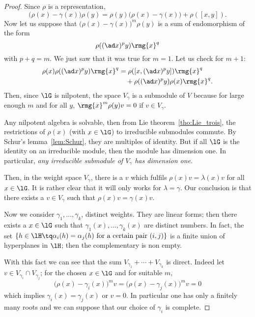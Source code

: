 \begin{proof}
	Since $\rho$ is a representation,
	\[
		\big(\rho(x)-\gamma(x)\big)\rho(y)=\rho(y)\big( \rho(x)-\gamma(x) \big)+\rho([x,y]).
	\]
	Now let us suppose that $\big(\rho(x)-\gamma(x)\big)^m\rho(y)$ is a sum of endomorphism of the form
	\[
		\rho( (\ad x)^py )\rmg{x}^q
	\]
	with $p+q=m$. We just saw that it was true for $m=1$. Let us check for $m+1$:
	\begin{equation}
		\begin{split}
			\rho(x)\rho( (\ad x)^py )\rmg{x}^q&=\rho( [x,(\ad x)^py] )\rmg{x}^q\\
			&\quad+\rho((\ad x)^py)\rho(x)\rmg{x}^q.
		\end{split}
	\end{equation}
	Then, since $\lG$ is nilpotent, the space $V_{\gamma}$ is a submodule of $V$ because for large enough $m$ and for all $y$, $\rmg{x}^m \rho(y)v=0$ if $v\in V_{\gamma}$.

	Any nilpotent algebra is solvable, then from Lie theorem~\ref{tho:Lie_trois}, the restrictions of $\rho(x)$ (with $x\in\lG$) to irreducible submodules commute. By Schur's lemma~\ref{lem:Schur}, they are multiples of identity. But if all $\lG$ is the identity on an irreducible module, then the module has dimension one. In particular, \emph{any irreducible submodule of $V_{\gamma}$ has dimension one}.

	Then, in the weight space $V_{\gamma}$, there is a $v$ which fulfils  $\rho(x)v=\lambda(x)v$ for all $x\in\lG$. It is rather clear that it will only works for $\lambda=\gamma$. Our conclusion is that there exists a $v\in V_{\gamma}$ such that $\rho(x)v=\gamma(x)v$.

	Now we consider $\gamma_1,\ldots,\gamma_k$, distinct weights. They are linear forms; then there exists a $x\in\lG$ such that $\gamma_1(x),\ldots,\gamma_k(x)$ are distinct numbers. In fact, the set $\{h\in\lH\tq \alpha_i(h)=\alpha_j(h)\text{ for a certain pair }(i,j)\}$ is a finite union of hyperplanes in $\lH$; then the complementary is non empty.


	With this fact we can see that the sum $V_{\gamma_1}+\cdots+V_{\gamma_k}$ is direct. Indeed let $v\in V_{\gamma_i}\cap V_{\gamma_j}$; for the chosen $x\in\lG$ and for suitable $m$,
	\begin{equation}
		\big(  \rho(x)-\gamma_i(x) \big)^mv=\big(  \rho(x)-\gamma_j(x) \big)^mv=0
	\end{equation}
	which implies $\gamma_i(x)=\gamma_j(x)$ or $v=0$. In particular one has only a finitely many roots and we can suppose that our choice of $\gamma_i$ is complete.


\end{proof}
